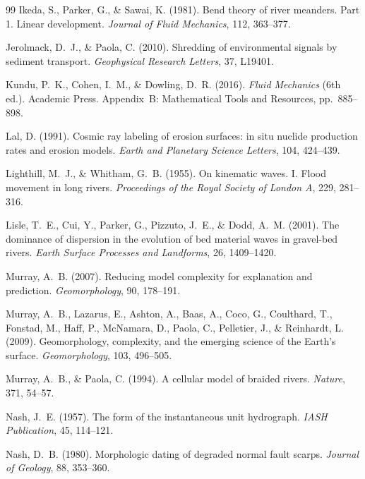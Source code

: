 \documentclass[11pt,letterpaper]{article}
\numberwithin{equation}{section}
\begin{document}
\begin{thebibliography}{99}
Ikeda, S., Parker, G., \& Sawai, K. (1981). Bend theory of river meanders. Part 1. Linear development. \emph{Journal of Fluid
Mechanics}, 112, 363--377.

Jerolmack, D.~J., \& Paola, C. (2010). Shredding of environmental signals by sediment transport. \emph{Geophysical Research
Letters}, 37, L19401.

Kundu, P.~K., Cohen, I.~M., \& Dowling, D.~R. (2016). \emph{Fluid Mechanics} (6th ed.). Academic Press. Appendix~B: Mathematical
Tools and Resources, pp.~885--898.

Lal, D. (1991). Cosmic ray labeling of erosion surfaces: in situ nuclide production rates and erosion models. \emph{Earth and
Planetary Science Letters}, 104, 424--439.

Lighthill, M.~J., \& Whitham, G.~B. (1955). On kinematic waves. I. Flood movement in long rivers. \emph{Proceedings of the Royal
Society of London A}, 229, 281--316.

Lisle, T.~E., Cui, Y., Parker, G., Pizzuto, J.~E., \& Dodd, A.~M. (2001). The dominance of dispersion in the evolution of bed
material waves in gravel-bed rivers. \emph{Earth Surface Processes and Landforms}, 26, 1409--1420.

Murray, A.~B. (2007). Reducing model complexity for explanation and prediction. \emph{Geomorphology}, 90, 178--191.

Murray, A.~B., Lazarus, E., Ashton, A., Baas, A., Coco, G., Coulthard, T., Fonstad, M., Haff, P., McNamara, D., Paola, C.,
Pelletier, J., \& Reinhardt, L. (2009). Geomorphology, complexity, and the emerging science of the Earth's surface.
\emph{Geomorphology}, 103, 496--505.

Murray, A.~B., \& Paola, C. (1994). A cellular model of braided rivers. \emph{Nature}, 371, 54--57.

Nash, J.~E. (1957). The form of the instantaneous unit hydrograph. \emph{IASH Publication}, 45, 114--121.

Nash, D.~B. (1980). Morphologic dating of degraded normal fault scarps. \emph{Journal of Geology}, 88, 353--360.


\end{thebibliography}
\end{document}
